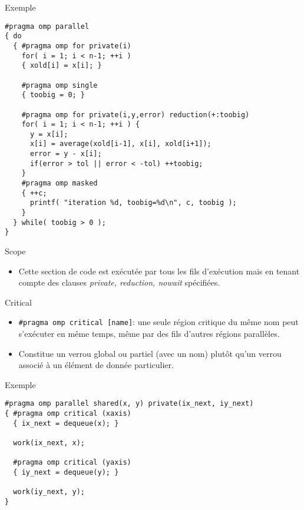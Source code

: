 \documentclass[10pt]{beamer}
\begin{document}
\begin{frame}[fragile]{Exemple}

  \scriptsize
  \begin{verbatim}
#pragma omp parallel
{ do
  { #pragma omp for private(i)
    for( i = 1; i < n-1; ++i ) 
    { xold[i] = x[i]; }

    #pragma omp single
    { toobig = 0; }

    #pragma omp for private(i,y,error) reduction(+:toobig)
    for( i = 1; i < n-1; ++i ) { 
      y = x[i];
      x[i] = average(xold[i-1], x[i], xold[i+1]);
      error = y - x[i];
      if(error > tol || error < -tol) ++toobig;
    }
    #pragma omp masked
    { ++c; 
      printf( "iteration %d, toobig=%d\n", c, toobig );
    }
  } while( toobig > 0 );
}
  \end{verbatim}
\end{frame}

\begin{frame}[fragile]{Scope}

  \begin{itemize}
    \item Cette section de code est exécutée par tous les fils d'exécution mais en tenant compte des clauses \textit{private, reduction, nowait} spécifiées.
  \end{itemize}
\end{frame}

\begin{frame}[fragile]{Critical}

  \begin{itemize}
    \item \verb|#pragma omp critical [name]|: une seule région critique du même nom peut s'exécuter en même temps, même par des fils d'autres régions parallèles.

    \item Constitue un verrou global ou partiel (avec un nom) plutôt qu'un verrou associé à un élément de donnée particulier.
  \end{itemize}
\end{frame}

 \begin{frame}[fragile]{Exemple}

  \begin{verbatim}
#pragma omp parallel shared(x, y) private(ix_next, iy_next)
{ #pragma omp critical (xaxis)
  { ix_next = dequeue(x); }

  work(ix_next, x);

  #pragma omp critical (yaxis)
  { iy_next = dequeue(y); }

  work(iy_next, y);
}
  \end{verbatim}
\end{frame}
\end{document}

